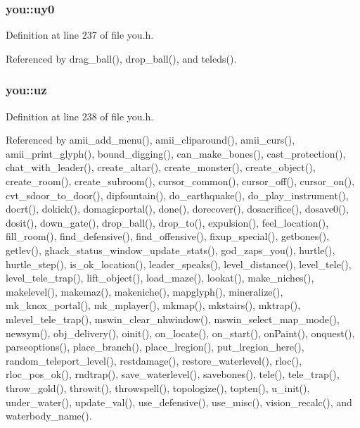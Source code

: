 \hypertarget{structyou_a9b39ba2afea70f31c1d423f8bdcb25a6}{
\subsubsection[{uy0}]{ you\+::uy0}}\label{structyou_a9b39ba2afea70f31c1d423f8bdcb25a6}


Definition at line 237 of file you.\+h.



Referenced by drag\+\_\+ball(), drop\+\_\+ball(), and teleds().

\hypertarget{structyou_a89878490db5d54221f04b3fb44ebdaa2}{
\subsubsection[{uz}]{ you\+::uz}}\label{structyou_a89878490db5d54221f04b3fb44ebdaa2}


Definition at line 238 of file you.\+h.



Referenced by amii\+\_\+add\+\_\+menu(), amii\+\_\+cliparound(), amii\+\_\+curs(), amii\+\_\+print\+\_\+glyph(), bound\+\_\+digging(), can\+\_\+make\+\_\+bones(), cast\+\_\+protection(), chat\+\_\+with\+\_\+leader(), create\+\_\+altar(), create\+\_\+monster(), create\+\_\+object(), create\+\_\+room(), create\+\_\+subroom(), cursor\+\_\+common(), cursor\+\_\+off(), cursor\+\_\+on(), cvt\+\_\+sdoor\+\_\+to\+\_\+door(), dipfountain(), do\+\_\+earthquake(), do\+\_\+play\+\_\+instrument(), docrt(), dokick(), domagicportal(), done(), dorecover(), dosacrifice(), dosave0(), dosit(), down\+\_\+gate(), drop\+\_\+ball(), drop\+\_\+to(), expulsion(), feel\+\_\+location(), fill\+\_\+room(), find\+\_\+defensive(), find\+\_\+offensive(), fixup\+\_\+special(), getbones(), getlev(), ghack\+\_\+status\+\_\+window\+\_\+update\+\_\+stats(), god\+\_\+zaps\+\_\+you(), hurtle(), hurtle\+\_\+step(), is\+\_\+ok\+\_\+location(), leader\+\_\+speaks(), level\+\_\+distance(), level\+\_\+tele(), level\+\_\+tele\+\_\+trap(), lift\+\_\+object(), load\+\_\+maze(), lookat(), make\+\_\+niches(), makelevel(), makemaz(), makeniche(), mapglyph(), mineralize(), mk\+\_\+knox\+\_\+portal(), mk\+\_\+mplayer(), mkmap(), mkstairs(), mktrap(), mlevel\+\_\+tele\+\_\+trap(), mswin\+\_\+clear\+\_\+nhwindow(), mswin\+\_\+select\+\_\+map\+\_\+mode(), newsym(), obj\+\_\+delivery(), oinit(), on\+\_\+locate(), on\+\_\+start(), on\+Paint(), onquest(), parseoptions(), place\+\_\+branch(), place\+\_\+lregion(), put\+\_\+lregion\+\_\+here(), random\+\_\+teleport\+\_\+level(), restdamage(), restore\+\_\+waterlevel(), rloc(), rloc\+\_\+pos\+\_\+ok(), rndtrap(), save\+\_\+waterlevel(), savebones(), tele(), tele\+\_\+trap(), throw\+\_\+gold(), throwit(), throwspell(), topologize(), topten(), u\+\_\+init(), under\+\_\+water(), update\+\_\+val(), use\+\_\+defensive(), use\+\_\+misc(), vision\+\_\+recalc(), and waterbody\+\_\+name().

